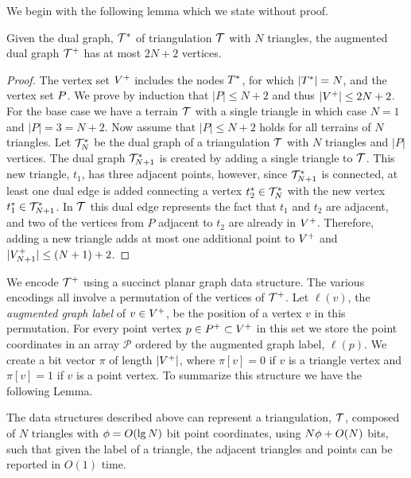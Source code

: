 {We begin with the following lemma which we state without proof. 

\begin{lemma}\label{lem:points_for_dual}
Given the dual graph, $\mathcal{T}^*$ of triangulation $\mathcal{T}$ with 
$N$ triangles, the augmented dual graph $\mathcal{T}^+$ has at most $2N+2$ 
vertices.
\end{lemma}

%
\begin{proof}
The vertex set $V^+$ includes the nodes $T^*$, for which 
$|T^*| = N$, and the vertex set $P$. 
We prove by induction that $|P| \le N+2$ and thus $|V^+| \le 2N + 2$. 
For the base case we have a terrain $\mathcal{T}$ with a single triangle in which case 
$N = 1$ and $|P| = 3  = N + 2$. 
Now assume that $|P| \le N + 2$ holds for all terrains of $N$ triangles. 
Let $\mathcal{T}^*_N$ be the dual graph of a triangulation $\mathcal{T}$ with $N$ 
triangles and $|P|$ vertices. 
The dual graph $\mathcal{T}^*_{N+1}$ is created by adding a single triangle 
to $\mathcal{T}$. This new triangle, $t_1$, has three adjacent points, however, 
since $\mathcal{T}^*_{N+1}$ is connected, at least one dual edge is added 
connecting a vertex $t^*_2 \in \mathcal{T}^*_N$ with the new vertex 
$t^*_1 \in \mathcal{T}^*_{N+1}$. 
In $\mathcal{T}$ this dual edge represents the fact that $t_1$ and $t_2$ are 
adjacent, and two of the vertices from $P$ adjacent to $t_2$ are already 
in $V^+$. Therefore, adding a new triangle adds at most one 
additional point to $V^+$ and $|V^+_{N+1}| \le (N+1) + 2$.
\end{proof}

We encode $\mathcal{T}^+$ using a succinct planar graph data structure.
The various encodings all involve a permutation of the vertices of 
$\mathcal{T}^+$.
Let $\ell(v)$, the \emph{augmented graph label} of $v \in V^+$, be 
the position of a vertex $v$ in this permutation. 
For every point vertex $p \in P^+ \subset V^+$ in this set 
we store the point coordinates in an array $\mathcal{P}$ ordered by the 
augmented graph label, $\ell(p)$. 
We create a bit vector $\pi$ of length $|V^+|$, where 
$\pi[v] = 0$ if $v$ is a triangle vertex and $\pi[v] = 1$ if $v$ is a 
point vertex. 
To summarize this structure we have the following Lemma.

\begin{lemma}\label{lem:terrain_space}
The data structures described above can represent a triangulation, $\mathcal{T}$, composed 
of $N$ triangles with $\phi = O(\lg{N})$ bit point coordinates, using 
$N\phi + O(N)$ bits, such that given the label of a triangle, the adjacent
 triangles and points can be reported in $O(1)$ time.
\end{lemma}

}
